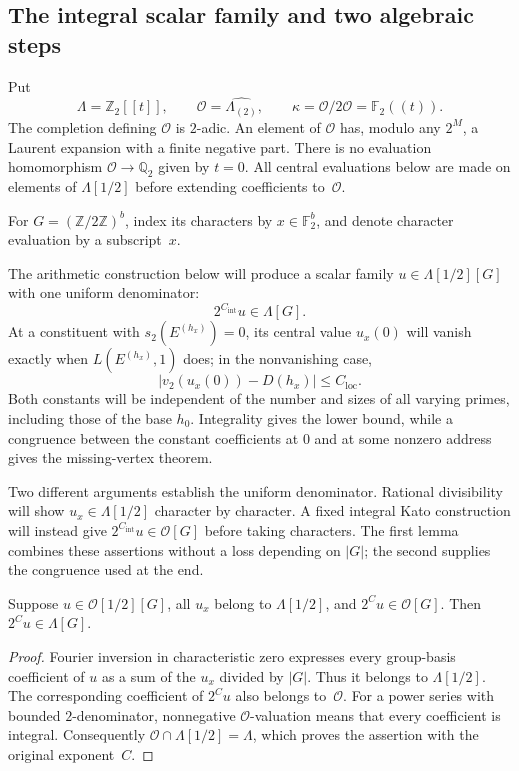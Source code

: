 \subsection{The integral scalar family and two algebraic steps}

Put
\[
 \Lambda=\mathbb Z _2[[t]],\qquad
 \mathcal O=\widehat{\Lambda_{(2)}},\qquad
 \kappa=\mathcal O/2\mathcal O=\mathbb F _2((t)).
\]
The completion defining $\mathcal O$ is $2$-adic.  An element of $\mathcal O$
has, modulo any $2^M$, a Laurent expansion with a finite negative part.
There is no evaluation homomorphism $\mathcal O\to\mathbb Q _2$ given by
$t=0$.  All central evaluations below are made on elements of
$\Lambda[1/2]$ before extending coefficients to~$\mathcal O$.

For $G=(\mathbb Z/2\mathbb Z)^b$, index its characters by
$x\in\mathbb F _2^b$, and denote character evaluation by a subscript~$x$.

The arithmetic construction below will produce a scalar family
$u\in\Lambda[1/2][G]$ with one uniform denominator:
\[
 2^{C_{\mathrm{int}}}u\in\Lambda[G].
\]
At a constituent with $s_2(E^{(h_x)})=0$, its central value $u_x(0)$
will vanish exactly when $L(E^{(h_x)},1)$ does; in the nonvanishing case,
\[
 \bigl|v_2(u_x(0))-D(h_x)\bigr|\leq C_{\mathrm{loc}}.
\]
Both constants will be independent of the number and sizes of all varying
primes, including those of the base $h_0$.  Integrality gives the lower
bound, while a congruence between the constant coefficients at $0$ and at
some nonzero address gives the missing-vertex theorem.

Two different arguments establish the uniform denominator.  Rational
divisibility will show $u_x\in\Lambda[1/2]$ character by character.
A fixed integral Kato construction will instead give
$2^{C_{\mathrm{int}}}u\in\mathcal O[G]$ before taking characters.
The first lemma combines these assertions without a loss depending on
$|G|$; the second supplies the congruence used at the end.

\begin{lemma}\label{cy:fourier}
Suppose $u\in\mathcal O[1/2][G]$, all $u_x$ belong to $\Lambda[1/2]$, and
$2^C u\in\mathcal O[G]$.  Then $2^C u\in\Lambda[G]$.
\end{lemma}
\begin{proof}
Fourier inversion in characteristic zero expresses every group-basis
coefficient of $u$ as a sum of the $u_x$ divided by $|G|$.  Thus it belongs
to $\Lambda[1/2]$.  The corresponding coefficient of $2^C u$ also belongs
to~$\mathcal O$.  For a power series with bounded $2$-denominator,
nonnegative $\mathcal O$-valuation means that every coefficient is integral.
Consequently $\mathcal O\cap\Lambda[1/2]=\Lambda$, which proves the assertion
with the original exponent~$C$.
\end{proof}

